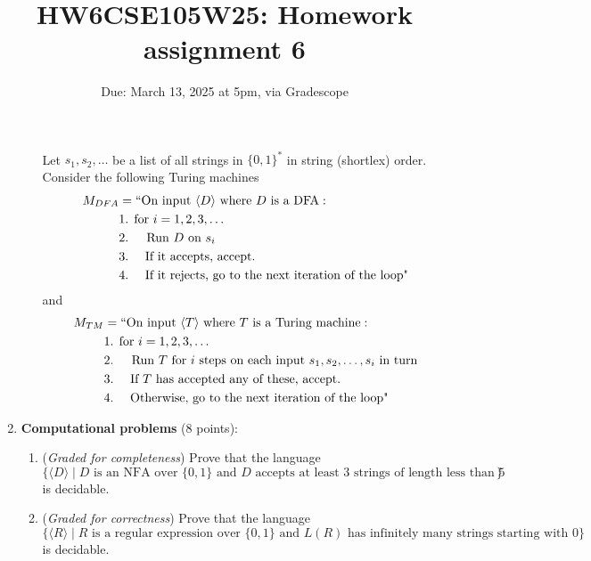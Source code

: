 \documentclass[12pt, oneside]{article}
\newcommand{\gradeCorrect}{({\it Graded for correctness}) }
\newcommand{\gradeComplete}{({\it Graded for completeness}) }
\begin{document}
\begin{enumerate}[wide, labelwidth=!, labelindent=0pt]
\begin{enumerate}
    Let $s_1, s_2, \ldots$ be a list of all strings in 
    $\{0,1\}^*$ in string (shortlex) order. Consider the following Turing machines
    \begin{align*}
        M_{DFA} &= ``\text{On input $\langle D \rangle$ where $D$ is a DFA}:\\
         &\text{1. for $i=1, 2, 3, \ldots$} \\
         &\text{2.~~~ Run $D$ on $s_i$} \\
         &\text{3.~~~~If it accepts, accept.}\\
         &\text{4.~~~~If it rejects, go to the next iteration of the loop"}\\
     \end{align*}
     and
     \begin{align*}
        M_{TM} &= ``\text{On input $\langle T \rangle$ where $T$ is a Turing machine}:\\
         &\text{1. for $i=1, 2, 3, \ldots$} \\
         &\text{2.~~~ Run $T$ for $i$ steps on each input $s_1, s_2, \ldots, s_i$ in turn} \\
         &\text{3.~~~~If $T$ has accepted any of these, accept.}\\
         &\text{4.~~~~Otherwise, go to the next iteration of the loop"}\\
     \end{align*}
\end{enumerate}


\item\textbf{Computational problems} (8 points):

\begin{enumerate}
    \item\gradeComplete Prove that the language $$\{\langle D \rangle \mid D \text{ is an NFA over $\{0,1\}$ and $D$ accepts at least $3$ strings 
    of length less than $5$ }\}$$
    is decidable.
    \item\gradeCorrect Prove that the language $$\{\langle R \rangle \mid R \text{ is a regular expression over $\{0,1\}$ and } L(R) \text{ has
    infinitely many strings starting with $0$} \}$$ is decidable.
\end{enumerate}

\end{enumerate}
\newpage

\title{HW6CSE105W25: Homework assignment 6}
\date{Due: March 13, 2025 at 5pm, via Gradescope}
\end{document}

